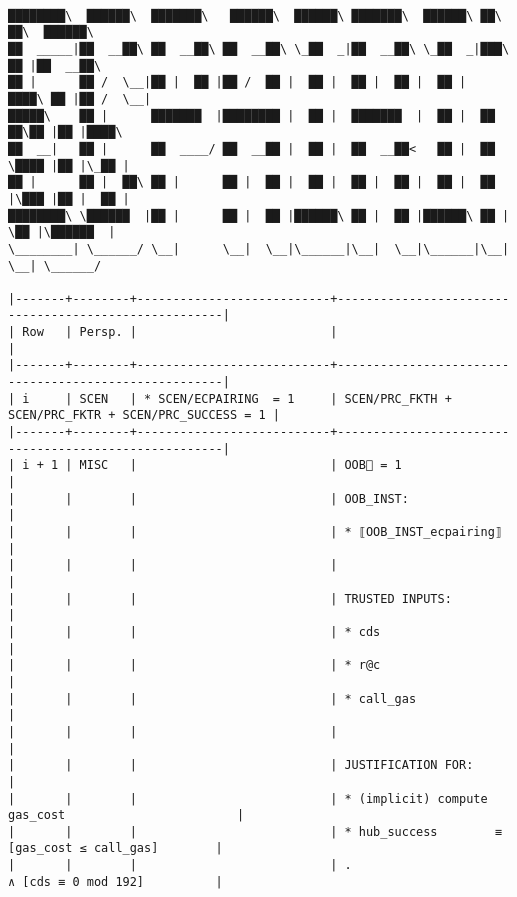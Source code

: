 \documentclass[varwidth=\maxdimen,margin=0.5cm,multi={verbatim}]{standalone}
\begin{document}
\begin{verbatim}

████████\  ██████\  ███████\   ██████\  ██████\ ███████\  ██████\ ██\   ██\  ██████\
██  _____|██  __██\ ██  __██\ ██  __██\ \_██  _|██  __██\ \_██  _|███\  ██ |██  __██\
██ |      ██ /  \__|██ |  ██ |██ /  ██ |  ██ |  ██ |  ██ |  ██ |  ████\ ██ |██ /  \__|
█████\    ██ |      ███████  |████████ |  ██ |  ███████  |  ██ |  ██ ██\██ |██ |████\
██  __|   ██ |      ██  ____/ ██  __██ |  ██ |  ██  __██<   ██ |  ██ \████ |██ |\_██ |
██ |      ██ |  ██\ ██ |      ██ |  ██ |  ██ |  ██ |  ██ |  ██ |  ██ |\███ |██ |  ██ |
████████\ \██████  |██ |      ██ |  ██ |██████\ ██ |  ██ |██████\ ██ | \██ |\██████  |
\________| \______/ \__|      \__|  \__|\______|\__|  \__|\______|\__|  \__| \______/

|-------+--------+---------------------------+------------------------------------------------------|
| Row   | Persp. |                           |                                                      |
|-------+--------+---------------------------+------------------------------------------------------|
| i     | SCEN   | * SCEN/ECPAIRING  = 1     | SCEN/PRC_FKTH + SCEN/PRC_FKTR + SCEN/PRC_SUCCESS = 1 |
|-------+--------+---------------------------+------------------------------------------------------|
| i + 1 | MISC   |                           | OOB🏴 = 1                                            |
|       |        |                           | OOB_INST:                                            |
|       |        |                           | * ⟦OOB_INST_ecpairing⟧                               |
|       |        |                           |                                                      |
|       |        |                           | TRUSTED INPUTS:                                      |
|       |        |                           | * cds                                                |
|       |        |                           | * r@c                                                |
|       |        |                           | * call_gas                                           |
|       |        |                           |                                                      |
|       |        |                           | JUSTIFICATION FOR:                                   |
|       |        |                           | * (implicit) compute gas_cost                        |
|       |        |                           | * hub_success        ≡  [gas_cost ≤ call_gas]        |
|       |        |                           | .                       ∧ [cds ≡ 0 mod 192]          |

\end{verbatim}
\end{document}
